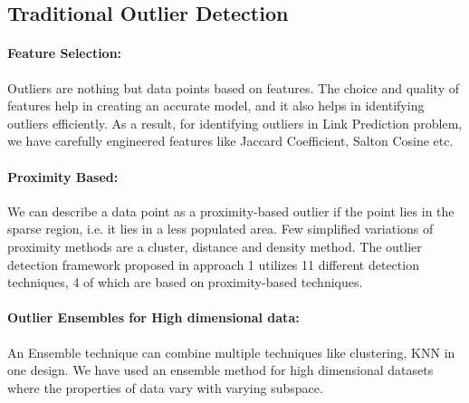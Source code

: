 \documentclass[runningheads]{llncs}
\begin{document}
\subsection{Traditional Outlier Detection}


\paragraph*{Feature Selection:}  Outliers are nothing but data points based on features. The choice and quality of features help in creating an accurate model, and it also helps in identifying outliers efficiently. As a result, for identifying outliers in Link Prediction problem, we have carefully engineered features like Jaccard Coefficient, Salton Cosine etc.

\paragraph*{Proximity Based:} We can describe a data point as a proximity-based outlier if the point lies in the sparse region, i.e. it lies in a less populated area. Few simplified variations of proximity methods are a cluster, distance and density method. The outlier detection framework proposed in approach 1 utilizes 11 different detection techniques, 4 of which are based on proximity-based techniques.

\paragraph*{Outlier Ensembles for High dimensional data:} An Ensemble technique can combine multiple techniques like clustering, KNN in one design. We have used an ensemble method for high dimensional datasets where the properties of data vary with varying subspace.
\end{document}
